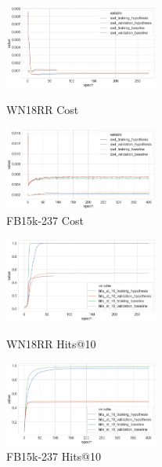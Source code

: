 \begin{figure}[H]
	\parbox{.5\linewidth}{
   		\centering
    		\includegraphics[width=0.45\textwidth, height=0.2\textheight]{WN18RR_Cost_Results}
		\caption{WN18RR Cost}
		}
	\hfill
	\parbox{.5\linewidth}{
   		\centering
		\includegraphics[width=0.45\textwidth, height=0.2\textheight]{FB15k-237_Cost_Results}
		\caption{FB15k-237 Cost}
		}
\end{figure}


\begin{figure}[H]
	\parbox{.5\linewidth}{
   		\centering
    		\includegraphics[width=0.45\textwidth, height=0.2\textheight]{WN18RR_hits_at_10_Results}
		\caption{WN18RR Hits@10}
		}
	\hfill
	\parbox{.5\linewidth}{
   		\centering
		\includegraphics[width=0.45\textwidth, height=0.2\textheight]{FB15k-237_hits_at_10_Results}
		\caption{FB15k-237 Hits@10}
		}
\end{figure}


